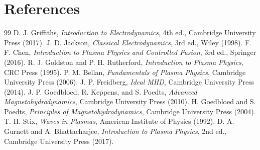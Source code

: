 \documentclass[11pt]{article}
\begin{document}
\section{References}
\begin{thebibliography}{99}
 D. J. Griffiths, \emph{Introduction to Electrodynamics}, 4th ed., Cambridge University Press (2017).
 J. D. Jackson, \emph{Classical Electrodynamics}, 3rd ed., Wiley (1998).
 F. F. Chen, \emph{Introduction to Plasma Physics and Controlled Fusion}, 3rd ed., Springer (2016).
 R. J. Goldston and P. H. Rutherford, \emph{Introduction to Plasma Physics}, CRC Press (1995).
 P. M. Bellan, \emph{Fundamentals of Plasma Physics}, Cambridge University Press (2006).
 J. P. Freidberg, \emph{Ideal MHD}, Cambridge University Press (2014).
 J. P. Goedbloed, R. Keppens, and S. Poedts, \emph{Advanced Magnetohydrodynamics}, Cambridge University Press (2010).
 H. Goedbloed and S. Poedts, \emph{Principles of Magnetohydrodynamics}, Cambridge University Press (2004).
 T. H. Stix, \emph{Waves in Plasmas}, American Institute of Physics (1992).
 D. A. Gurnett and A. Bhattacharjee, \emph{Introduction to Plasma Physics}, 2nd ed., Cambridge University Press (2017).
\end{thebibliography}
\end{document}
